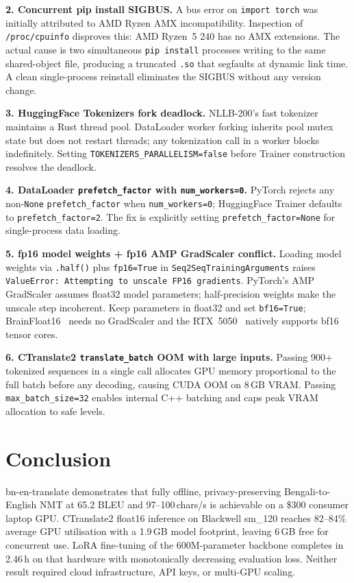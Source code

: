 \documentclass[sigconf]{acmart}
\newcommand{\TRAINDURATION}{2.46\,h}
\begin{document}
\textbf{2. Concurrent pip install SIGBUS.}
A bus error on \texttt{import torch} was initially attributed to AMD Ryzen AMX
incompatibility.
Inspection of \texttt{/proc/cpuinfo} disproves this: AMD Ryzen~5 240 has no AMX
extensions.
The actual cause is two simultaneous \texttt{pip install} processes writing to the
same shared-object file, producing a truncated \texttt{.so} that segfaults at
dynamic link time.
A clean single-process reinstall eliminates the SIGBUS without any version change.

\textbf{3. HuggingFace Tokenizers fork deadlock.}
NLLB-200's fast tokenizer maintains a Rust thread pool.
DataLoader worker forking inherits pool mutex state but does not restart threads;
any tokenization call in a worker blocks indefinitely.
Setting \texttt{TOKENIZERS\_PARALLELISM=false} before Trainer construction resolves
the deadlock.

\textbf{4. DataLoader \texttt{prefetch\_factor} with \texttt{num\_workers=0}.}
PyTorch rejects any non-\texttt{None} \texttt{prefetch\_factor} when
\texttt{num\_workers=0}; HuggingFace Trainer defaults to \texttt{prefetch\_factor=2}.
The fix is explicitly setting \texttt{prefetch\_factor=None} for single-process
data loading.

\textbf{5. fp16 model weights + fp16 AMP GradScaler conflict.}
Loading model weights via \texttt{.half()} plus \texttt{fp16=True} in
\texttt{Seq2SeqTrainingArguments} raises
\texttt{ValueError: Attempting to unscale FP16 gradients}.
PyTorch's AMP GradScaler assumes float32 model parameters; half-precision weights
make the unscale step incoherent.
Keep parameters in float32 and set \texttt{bf16=True}; BrainFloat16~\cite{micikevicius2018mixed}
needs no GradScaler and the RTX~5050~\cite{nvidia_blackwell} natively supports
bf16 tensor cores.

\textbf{6. CTranslate2 \texttt{translate\_batch} OOM with large inputs.}
Passing 900+ tokenized sequences in a single call allocates GPU memory proportional
to the full batch before any decoding, causing CUDA OOM on 8\,GB VRAM.
Passing \texttt{max\_batch\_size=32} enables internal C++ batching and caps peak
VRAM allocation to safe levels.

\section{Conclusion}

bn-en-translate demonstrates that fully offline, privacy-preserving Bengali-to-English
NMT at 65.2 BLEU and 97--100\,chars/s is achievable on a \$300 consumer laptop GPU.
CTranslate2 float16 inference on Blackwell sm\_120 reaches 82--84\% average GPU
utilisation with a 1.9\,GB model footprint, leaving 6\,GB free for concurrent use.
LoRA fine-tuning of the 600M-parameter backbone completes in \TRAINDURATION{}
on that hardware with monotonically decreasing evaluation loss.
Neither result required cloud infrastructure, API keys, or multi-GPU scaling.
\end{document}

